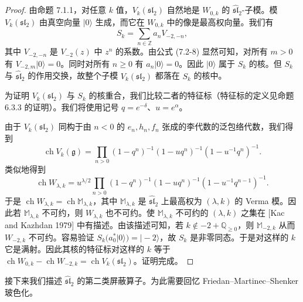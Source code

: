 \begin{proof}
由命题 7.1.1，对任意 $k$ 值，$V_k(\mathfrak{sl}_2)$ 自然地是 $W_{0,k}$ 的 $\widehat{\mathfrak{sl}}_2$-子模。模 $V_k(\mathfrak{sl}_2)$ 由真空向量 $|0\rangle$ 生成，而它在 $W_{0,k}$ 中的像是最高权向量。我们有
\[
    S_k=\sum_{n\in\mathbb{Z}}a_nV_{-2,-n},
\]
其中 $V_{-2,-n}$ 是 $V_{-2}(z)$ 中 $z^n$ 的系数。由公式 (7.2-8) 显然可知，对所有 $m>0$ 有 $V_{-2,m}|0\rangle=0$。同时对所有 $n\ge0$ 有 $a_n|0\rangle=0$。因此 $|0\rangle$ 属于 $S_k$ 的核。但 $S_k$ 与 $\widehat{\mathfrak{sl}}_2$ 的作用交换，故整个子模 $V_k(\mathfrak{sl}_2)$ 都落在 $S_k$ 的核中。

为证明 $V_k(\mathfrak{sl}_2)$ 与 $S_k$ 的核重合，我们比较二者的特征标（特征标的定义见命题 6.3.3 的证明）。我们将使用记号 $q=e^{-\delta}$、$u=e^{\alpha}$。

由于 $V_k(\mathfrak{sl}_2)$ 同构于由 $n<0$ 的 $e_n,h_n,f_n$ 张成的李代数的泛包络代数，我们得到
\begin{equation}
    \operatorname{ch}V_k(\mathfrak{g})=\prod_{n>0}(1-q^n)^{-1}(1-uq^n)^{-1}(1-u^{-1}q^n)^{-1}.
    \tag{7.2-9}
\end{equation}
类似地得到
\[
    \operatorname{ch}W_{\lambda,k}=u^{\lambda/2}\prod_{n>0}(1-q^n)^{-1}(1-uq^n)^{-1}(1-u^{-1}q^{n-1})^{-1}.
\]
于是 $\operatorname{ch}W_{\lambda,k}=\operatorname{ch}\mathbb{M}_{\lambda,k}$，其中 $\mathbb{M}_{\lambda,k}$ 是 $\widehat{\mathfrak{sl}}_2$ 上最高权为 $(\lambda,k)$ 的 Verma 模。因此若 $\mathbb{M}_{\lambda,k}$ 不可约，则 $W_{\lambda,k}$ 也不可约。使 $\mathbb{M}_{\lambda,k}$ 不可约的 $(\lambda,k)$ 之集在 [Kac and Kazhdan 1979] 中有描述。由该描述可知，若 $k\notin-2+\mathbb{Q}_{\ge0}$，则 $\mathbb{M}_{-2,k}$ 从而 $W_{-2,k}$ 不可约。容易验证 $S_k(a_0^*|0\rangle)=|-2\rangle$，故 $S_k$ 是非零同态。于是对这样的 $k$ 它是满射。因此其核的特征标对这样的 $k$ 等于 $\operatorname{ch}W_{0,k}-\operatorname{ch}W_{-2,k}=\operatorname{ch}V_k(\mathfrak{sl}_2)$。证明完成。
\end{proof}

接下来我们描述 $\widehat{\mathfrak{sl}}_2$ 的第二类屏蔽算子。为此需要回忆 Friedan--Martinec--Shenker 玻色化。


